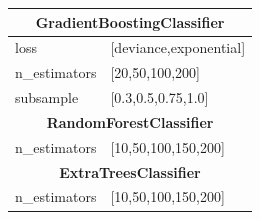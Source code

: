 {\begin{longtable}{l l}
\midrule
\multicolumn{2}{c}{\textbf{GradientBoostingClassifier}} \\*
\midrule

loss & [deviance,exponential] \\
n\_estimators & [20,50,100,200] \\
subsample & [0.3,0.5,0.75,1.0] \\


\midrule
\multicolumn{2}{c}{\textbf{RandomForestClassifier}} \\*
\midrule

n\_estimators & [10,50,100,150,200] \\


\midrule
\multicolumn{2}{c}{\textbf{ExtraTreesClassifier}} \\*
\midrule

n\_estimators & [10,50,100,150,200] \\


\bottomrule

\end{longtable}
}

